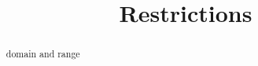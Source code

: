 \documentclass{ximera}
\title{Restrictions}
\begin{document}
\begin{abstract}
domain and range
\end{abstract}
\maketitle
\end{document}
